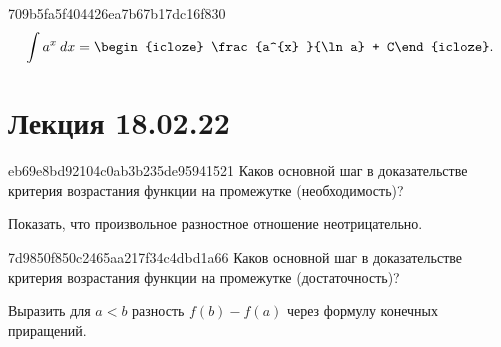 \begin{note}{709b5fa5f404426ea7b67b17dc16f830}
    \[
        \int a^{x} \: dx = \begin{icloze}{1}\frac{a^{x} }{\ln a} + C\end{icloze}.
    \]
\end{note}

\section{Лекция 18.02.22}

\begin{note}{eb69e8bd92104c0ab3b235de95941521}
    Каков основной шаг в доказательстве критерия возрастания функции на промежутке (необходимость)?

    \begin{cloze}{1}
        Показать, что произвольное разностное отношение неотрицательно.
    \end{cloze}
\end{note}

\begin{note}{7d9850f850c2465aa217f34c4dbd1a66}
    Каков основной шаг в доказательстве критерия возрастания функции на промежутке (достаточность)?

    \begin{cloze}{1}
        Выразить для \( a < b \) разность \( f(b) - f(a) \) через формулу конечных приращений.
    \end{cloze}
\end{note}

